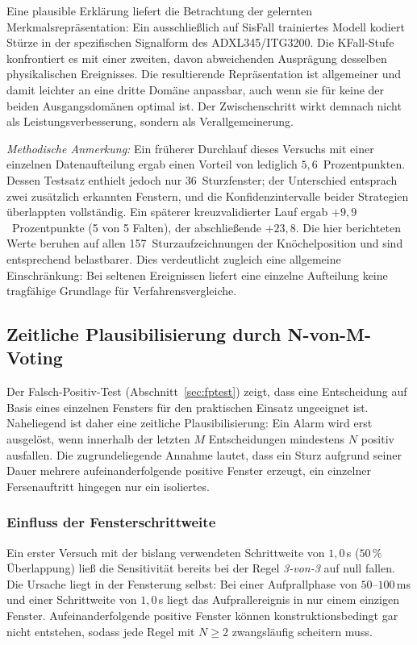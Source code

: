 \documentclass[11pt,a4paper,oneside]{report}
\begin{document}
Eine plausible Erklärung liefert die Betrachtung der gelernten
Merkmalsrepräsentation: Ein ausschließlich auf SisFall trainiertes
Modell kodiert Stürze in der spezifischen Signalform des
ADXL345/ITG3200. Die KFall-Stufe konfrontiert es mit einer zweiten,
davon abweichenden Ausprägung desselben physikalischen Ereignisses.
Die resultierende Repräsentation ist allgemeiner und damit leichter
an eine dritte Domäne anpassbar, auch wenn sie für keine der beiden
Ausgangsdomänen optimal ist. Der Zwischenschritt wirkt demnach nicht
als Leistungsverbesserung, sondern als Verallgemeinerung.

\medskip
\noindent\textit{Methodische Anmerkung:} Ein früherer Durchlauf
dieses Versuchs mit einer einzelnen Datenaufteilung ergab einen
Vorteil von lediglich $5{,}6$~Prozentpunkten. Dessen Testsatz enthielt
jedoch nur 36~Sturzfenster; der Unterschied entsprach zwei zusätzlich
erkannten Fenstern, und die Konfidenzintervalle beider Strategien
überlappten vollständig. Ein späterer kreuzvalidierter Lauf ergab $+9{,}9$~Prozentpunkte
(5 von 5 Falten), der abschließende $+23{,}8$. Die hier berichteten
Werte beruhen auf allen 157~Sturzaufzeichnungen der Knöchelposition und sind entsprechend
belastbarer. Dies verdeutlicht zugleich eine allgemeine
Einschränkung: Bei seltenen Ereignissen liefert eine einzelne
Aufteilung keine tragfähige Grundlage für Verfahrensvergleiche.

\subsection{Zeitliche Plausibilisierung durch N-von-M-Voting}
\label{sec:voting}

Der Falsch-Positiv-Test (Abschnitt~\ref{sec:fptest}) zeigt, dass eine
Entscheidung auf Basis eines einzelnen Fensters für den praktischen
Einsatz ungeeignet ist. Naheliegend ist daher eine zeitliche
Plausibilisierung: Ein Alarm wird erst ausgelöst, wenn innerhalb der
letzten $M$ Entscheidungen mindestens $N$ positiv ausfallen. Die
zugrundeliegende Annahme lautet, dass ein Sturz aufgrund seiner Dauer
mehrere aufeinanderfolgende positive Fenster erzeugt, ein einzelner
Fersenauftritt hingegen nur ein isoliertes.

\subsubsection{Einfluss der Fensterschrittweite}

Ein erster Versuch mit der bislang verwendeten Schrittweite von
$1{,}0$\,s ($50\,\%$ Überlappung) ließ die Sensitivität bereits bei
der Regel \emph{3-von-3} auf null fallen. Die Ursache liegt in der
Fensterung selbst: Bei einer Aufprallphase von $50$--$100$\,ms und
einer Schrittweite von $1{,}0$\,s liegt das Aufprallereignis in nur
einem einzigen Fenster. Aufeinanderfolgende positive Fenster können
konstruktionsbedingt gar nicht entstehen, sodass jede Regel mit
$N \geq 2$ zwangsläufig scheitern muss.
\end{document}
